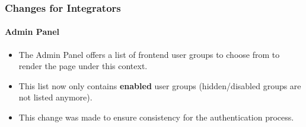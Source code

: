 %

\begin{frame}[fragile]
	\frametitle{Changes for Integrators}
	\framesubtitle{Admin Panel}


	\begin{itemize}
		\item The Admin Panel offers a list of frontend user groups to choose
			from to render the page under this context.
		\item This list now only contains \textbf{enabled} user groups
			(hidden/disabled groups are not listed anymore).
		\item This change was made to ensure consistency for the authentication
			process.
	\end{itemize}
\end{frame}

